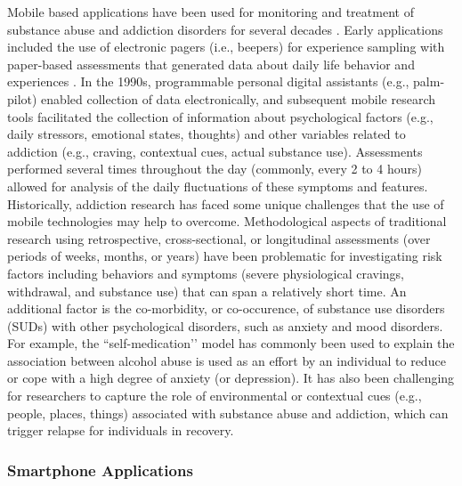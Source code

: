 \documentclass[sigconf]{acmart}
\begin{document}
Mobile based applications have been used for monitoring and treatment of
substance abuse and addiction disorders for several decades \cite{boyer10}. 
Early applications included the use of electronic pagers (i.e., beepers) 
for experience sampling with paper-based assessments that generated data about 
daily life behavior and experiences \cite{swedenson16}. In the 1990s, 
programmable personal digital assistants (e.g., palm-pilot) enabled collection 
of data electronically, and subsequent mobile research tools facilitated the 
collection of information about psychological factors (e.g., daily stressors, 
emotional states, thoughts) and other variables related to addiction (e.g., 
craving, contextual cues, actual substance use). Assessments performed several 
times throughout the day (commonly, every 2 to 4 hours) allowed for analysis of 
the daily fluctuations of these symptoms and features. Historically, addiction 
research has faced some unique challenges that the use of mobile technologies 
may help to overcome. Methodological aspects of traditional research using 
retrospective, cross-sectional, or longitudinal assessments (over periods of 
weeks, months, or years) have been problematic for investigating risk factors 
including behaviors and symptoms (severe physiological cravings, withdrawal, 
and substance use) that can span a relatively short time. An additional factor 
is the co-morbidity, or co-occurence, of substance use disorders (SUDs) with 
other psychological disorders, such as anxiety and mood disorders. For example, 
the ``self-medication’’ model has commonly been used to explain the association 
between alcohol abuse is used as an effort by an individual to reduce or cope 
with a high degree of anxiety (or depression). It has also been challenging 
for researchers to capture the role of environmental or contextual cues (e.g., 
people, places, things) associated with substance abuse and addiction, which 
can trigger relapse for individuals in recovery.


\subsubsection*{Smartphone Applications}
\end{document}
